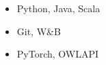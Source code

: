 
\begin{small}
  \begin{itemize}\color{text}

  \item {} Python, Java, Scala

  \item {} Git, W\&B

  \item {} PyTorch, OWLAPI

  
  \end{itemize}
\end{small}
